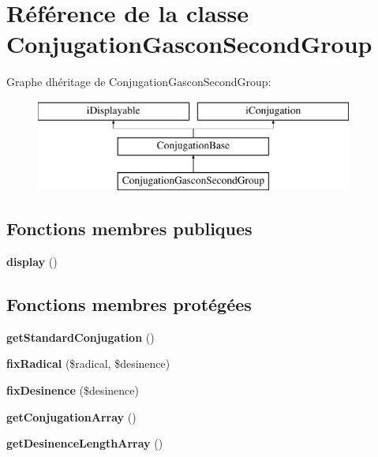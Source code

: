 \hypertarget{classConjugationGasconSecondGroup}{}\section{Référence de la classe Conjugation\+Gascon\+Second\+Group}
\label{classConjugationGasconSecondGroup}
Graphe d\textquotesingle{}héritage de Conjugation\+Gascon\+Second\+Group\+:\begin{figure}[H]
\begin{center}
\leavevmode
\includegraphics[height=3.000000cm]{classConjugationGasconSecondGroup}
\end{center}
\end{figure}
\subsection*{Fonctions membres publiques}
\begin{DoxyCompactItemize}
\item 
\hypertarget{classConjugationGasconSecondGroup_a6e3085b2af7792e60d3126709d8c521e}{}\label{classConjugationGasconSecondGroup_a6e3085b2af7792e60d3126709d8c521e} 
{\bfseries display} ()
\end{DoxyCompactItemize}
\subsection*{Fonctions membres protégées}
\begin{DoxyCompactItemize}
\item 
\hypertarget{classConjugationGasconSecondGroup_a53a63dc5e1a47aa4035efa26a1b45bf1}{}\label{classConjugationGasconSecondGroup_a53a63dc5e1a47aa4035efa26a1b45bf1} 
{\bfseries get\+Standard\+Conjugation} ()
\item 
\hypertarget{classConjugationGasconSecondGroup_ad51616cc8f2024140f71255e7fcc681f}{}\label{classConjugationGasconSecondGroup_ad51616cc8f2024140f71255e7fcc681f} 
{\bfseries fix\+Radical} (\$radical, \$desinence)
\item 
\hypertarget{classConjugationGasconSecondGroup_ae8d66e6a63002678daa884d3ca3a8ac1}{}\label{classConjugationGasconSecondGroup_ae8d66e6a63002678daa884d3ca3a8ac1} 
{\bfseries fix\+Desinence} (\$desinence)
\item 
\hypertarget{classConjugationGasconSecondGroup_a3702a68d3d15efe2b5109fe8800f7418}{}\label{classConjugationGasconSecondGroup_a3702a68d3d15efe2b5109fe8800f7418} 
{\bfseries get\+Conjugation\+Array} ()
\item 
\hypertarget{classConjugationGasconSecondGroup_a1584544e4c12dd19fa52703d37ced44d}{}\label{classConjugationGasconSecondGroup_a1584544e4c12dd19fa52703d37ced44d} 
{\bfseries get\+Desinence\+Length\+Array} ()
\end{DoxyCompactItemize}
